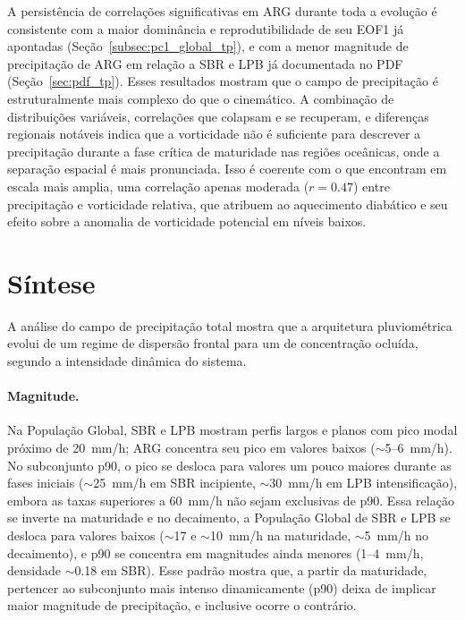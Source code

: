 A persistência de correlações significativas em ARG durante toda a evolução é consistente com a maior dominância e reprodutibilidade de seu EOF1 já apontadas (Seção~\ref{subsec:pc1_global_tp}), e com a menor magnitude de precipitação de ARG em relação a SBR e LPB já documentada no PDF (Seção~\ref{sec:pdf_tp}).
Esses resultados mostram que o campo de precipitação é estruturalmente mais complexo do que o cinemático. A combinação de distribuições variáveis, correlações que colapsam e se recuperam, e diferenças regionais notáveis indica que a vorticidade não é suficiente para descrever a precipitação durante a fase crítica de maturidade nas regiões oceânicas, onde a separação espacial é mais pronunciada. Isso é coerente com o que \citet{corner2025classification} encontram em escala mais amplia, uma correlação apenas moderada ($r = 0.47$) entre precipitação e vorticidade relativa, que atribuem ao aquecimento diabático e seu efeito sobre a anomalia de vorticidade potencial em níveis baixos.

\section{Síntese}\label{sec:sintesis_tp}

A análise do campo de precipitação total mostra que a arquitetura pluviométrica evolui de um regime de dispersão frontal para um de concentração ocluída, segundo a intensidade dinâmica do sistema.

\paragraph{Magnitude.}
Na População Global, SBR e LPB mostram perfis largos e planos com pico modal próximo de 20~mm/h; ARG concentra seu pico em valores baixos (${\sim}$5--6~mm/h). No subconjunto p90, o pico se desloca para valores um pouco maiores durante as fases iniciais (${\sim}$25~mm/h em SBR incipiente, ${\sim}$30~mm/h em LPB intensificação), embora as taxas superiores a 60~mm/h não sejam exclusivas de p90. Essa relação se inverte na maturidade e no decaimento, a População Global de SBR e LPB se desloca para valores baixos (${\sim}$17 e ${\sim}$10~mm/h na maturidade, ${\sim}$5~mm/h no decaimento), e p90 se concentra em magnitudes ainda menores (1--4~mm/h, densidade ${\sim}$0.18 em SBR). Esse padrão mostra que, a partir da maturidade, pertencer ao subconjunto mais intenso dinamicamente (p90) deixa de implicar maior magnitude de precipitação, e inclusive ocorre o contrário.

